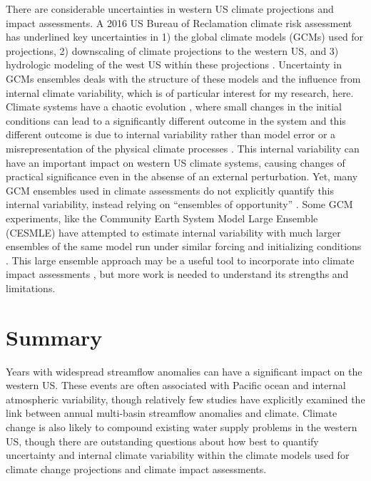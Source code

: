 \documentclass[final, double]{ua-thesis}
\begin{document}
There are considerable uncertainties in western US climate projections and impact assessments. A 2016 US Bureau of Reclamation climate risk assessment has underlined key uncertainties in 1) the global climate models (GCMs) used for projections, 2) downscaling of climate projections to the western US, and 3) hydrologic modeling of the west US within these projections \citep{us_bureau_of_reclamation_west-wide_2016}. Uncertainty in GCMs ensembles deals with the structure of these models and the influence from internal climate variability, which is of particular interest for my research, here. Climate systems have a chaotic evolution \citep{lorenz_deterministic_1963}, where small changes in the initial conditions can lead to a significantly different outcome in the system and this different outcome is due to internal variability rather than model error or a misrepresentation of the physical climate processes \citep{deser_uncertainty_2012, deser_communication_2012, knutti_climate_2013, tebaldi_mapping_2011}. This internal variability can have an important impact on western US climate systems, causing changes of practical significance even in the absense of an external perturbation. Yet, many GCM ensembles used in climate assessments do not explicitly quantify this internal variability, instead relying on ``ensembles of opportunity'' \citep{murphy_quantification_2004, tebaldi_use_2007, knutti_challenges_2009}. Some GCM experiments, like the Community Earth System Model Large Ensemble (CESMLE) have attempted to estimate internal variability with much larger ensembles of the same model run under similar forcing and initializing conditions \citep{kay_community_2014}. This large ensemble approach may be a useful tool to incorporate into climate impact assessments \citep{us_bureau_of_reclamation_west-wide_2016}, but more work is needed to understand its strengths and limitations.

\section{Summary}

Years with widespread streamflow anomalies can have a significant impact on the western US. These events are often associated with Pacific ocean and internal atmospheric variability, though relatively few studies have explicitly examined the link between annual multi-basin streamflow anomalies and climate. Climate change is also likely to compound existing water supply problems in the western US, though there are outstanding questions about how best to quantify uncertainty and internal climate variability within the climate models used for climate change projections and climate impact assessments.
\end{document}
